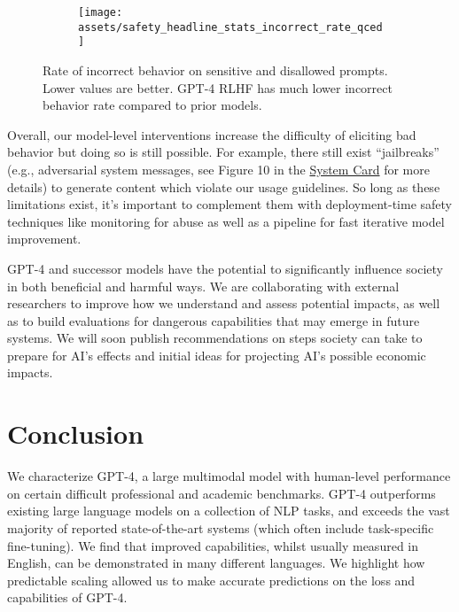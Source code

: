 \documentclass{article}
\begin{document}
\begin{figure}
    \centering
    \begin{subfigure}{\linewidth}
      \centering
      \texttt{[image: assets/safety\_headline\_stats\_incorrect\_rate\_qced]}
      \label{fig:safety_headline_stats}
    \end{subfigure}\hspace{5mm} \caption{ Rate of incorrect behavior on sensitive and disallowed prompts. Lower values are better. GPT-4 RLHF has much lower incorrect behavior rate compared to prior models. 
    }
    \label{fig:safety_plots}
\end{figure}


Overall, our model-level interventions increase the difficulty of eliciting bad behavior but doing so is still possible. For example, there still exist “jailbreaks” (e.g., adversarial system messages, see Figure 10 in the \hyperref[systemcard]{System Card} for more details) to generate content which violate our usage guidelines. So long as these limitations exist, it’s important to complement them with deployment-time safety techniques like monitoring for abuse as well as a pipeline for fast iterative model improvement.

GPT-4 and successor models have the potential to significantly influence society in both beneficial and harmful ways. We are collaborating with external researchers to improve how we understand and assess potential impacts, as well as to build evaluations for dangerous capabilities that may emerge in future systems. We will soon publish recommendations on steps society can take to prepare for AI's effects and initial ideas for projecting AI’s possible economic impacts.







 
\section{Conclusion}

We characterize GPT-4, a large multimodal model with human-level performance on certain difficult professional and academic benchmarks. GPT-4 outperforms existing large language models on a collection of NLP tasks, and exceeds the vast majority of reported state-of-the-art systems (which often include task-specific fine-tuning). We find that improved capabilities, whilst usually measured in English, can be demonstrated in many different languages. We highlight how predictable scaling allowed us to make accurate predictions on the loss and capabilities of GPT-4. 
\end{document}
